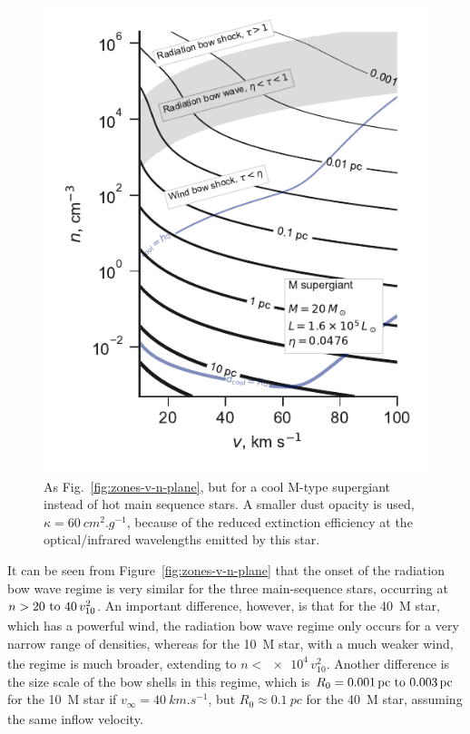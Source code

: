 \begin{figure}
  \includegraphics[width=\linewidth]{figs/zones-v-n-plane-RSG}
  \caption{As Fig.~\ref{fig:zones-v-n-plane}, but for a cool M-type
    supergiant instead of hot main sequence stars.  A smaller dust
    opacity is used, \(\kappa = \SI{60}{cm^2.g^{-1}}\), because of the
    reduced extinction efficiency at the optical/infrared wavelengths
    emitted by this star.}
  \label{fig:M-supergiant}
\end{figure}

It can be seen from Figure~\ref{fig:zones-v-n-plane} that the onset of
the radiation bow wave regime is very similar for the three
main-sequence stars, occurring at
\(n > \text{\numrange{20}{40}} \, v_{10}^2\).  An important
difference, however, is that for the \SI{40}{M_\odot} star, which has a
powerful wind, the radiation bow wave regime only occurs for a very
narrow range of densities, whereas for the \SI{10}{M_\odot} star, with a
much weaker wind, the regime is much broader, extending to
\(n < \num{e4} \, v_{10}^2\).  Another difference is the size scale of
the bow shells in this regime, which is
\(R_0 = \text{\SIrange{0.001}{0.003}{pc}}\) for the \SI{10}{M_\odot} star
if \(v_\infty = \SI{40}{km.s^{-1}}\), but \(R_0 \approx \SI{0.1}{pc}\) for the
\SI{40}{M_\odot} star, assuming the same inflow velocity.

